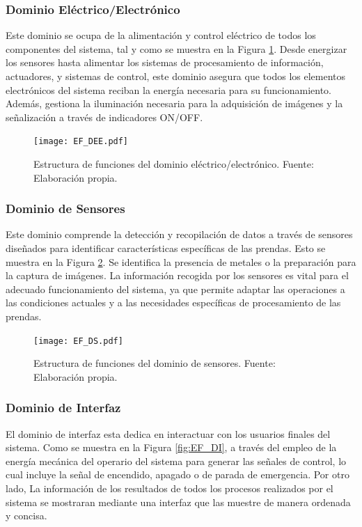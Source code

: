 \subsubsection{Dominio Eléctrico/Electrónico}

Este dominio se ocupa de la alimentación y control eléctrico de todos los componentes del sistema, tal y como se muestra en la Figura \ref{fig:EF_DEE}. Desde energizar los sensores hasta alimentar los sistemas de procesamiento de información, actuadores, y sistemas de control, este dominio asegura que todos los elementos electrónicos del sistema reciban la energía necesaria para su funcionamiento. Además, gestiona la iluminación necesaria para la adquisición de imágenes y la señalización a través de indicadores ON/OFF.

\begin{figure}[H]
	\centering
	\texttt{[image: EF\_DEE.pdf]}
	\caption[Estructura de funciones del dominio eléctrico/electrónico.]{Estructura de funciones del dominio eléctrico/electrónico. Fuente: Elaboración propia.}
	\label{fig:EF_DEE}
\end{figure}

\subsubsection{Dominio de Sensores}

Este dominio comprende la detección y recopilación de datos a través de sensores diseñados para identificar características específicas de las prendas. Esto se muestra en la Figura \ref{fig:EF_DS}. Se identifica la presencia de metales o la preparación para la captura de imágenes. La información recogida por los sensores es vital para el adecuado funcionamiento del sistema, ya que permite adaptar las operaciones a las condiciones actuales y a las necesidades específicas de procesamiento de las prendas.

\begin{figure}[H]
	\centering
	\texttt{[image: EF\_DS.pdf]}
	\caption[Estructura de funciones del dominio de sensores.]{Estructura de funciones del dominio de sensores. Fuente: Elaboración propia.}
	\label{fig:EF_DS}
\end{figure}

\subsubsection{Dominio de Interfaz}

El dominio de interfaz esta dedica en interactuar con los usuarios finales del sistema. Como se muestra en la Figura \ref{fig:EF_DI}, a través del empleo de la energía mecánica del operario del sistema para generar las señales de control, lo cual incluye la señal de encendido, apagado o de parada de emergencia. Por otro lado, La información de los resultados de todos los procesos realizados por el sistema se mostraran mediante una interfaz que las muestre de manera ordenada y concisa.

